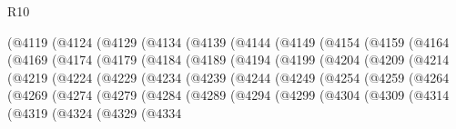 \begin{lexlean}{R10}
\begin{coremodule}
{{{{{{{{{{{{{{{{{{{{{{{{{{{{{{{{{{{{{{{{{{{{{{{{{{{{{{{{{{{{{{{{{{{{{{{{{{{{{{{{{{{{          (@4119
            (@4124
              (@4129
                (@4134
                  (@4139
                    (@4144
                      (@4149
                        (@4154
                          (@4159
                            (@4164
                              (@4169
                                (@4174
                                  (@4179
                                    (@4184
                                      (@4189
                                        (@4194
                                          (@4199
                                            (@4204
                                              (@4209
                                                (@4214
                                                  (@4219
                                                    (@4224
                                                      (@4229
                                                        (@4234
                                                          (@4239
                                                            (@4244
                                                              (@4249
                                                                (@4254
                                                                  (@4259
                                                                    (@4264
                                                                      (@4269
                                                                        (@4274
                                                                          (@4279
                                                                            (@4284
                                                                              (@4289
                                                                                (@4294
                                                                                  (@4299
                                                                                    (@4304
                                                                                      (@4309
                                                                                        (@4314
                                                                                          (@4319
                                                                                            (@4324
                                                                                              (@4329
                                                                                                (@4334
}}}}}}}}}}}}}}}}}}}}}}}}}}}}}}}}}}}}}}}}}}}}}}}}}}}}}}}}}}}}}}}}}}}}}}}}}}}}}}}}}}}}
\end{coremodule}
\end{lexlean}
